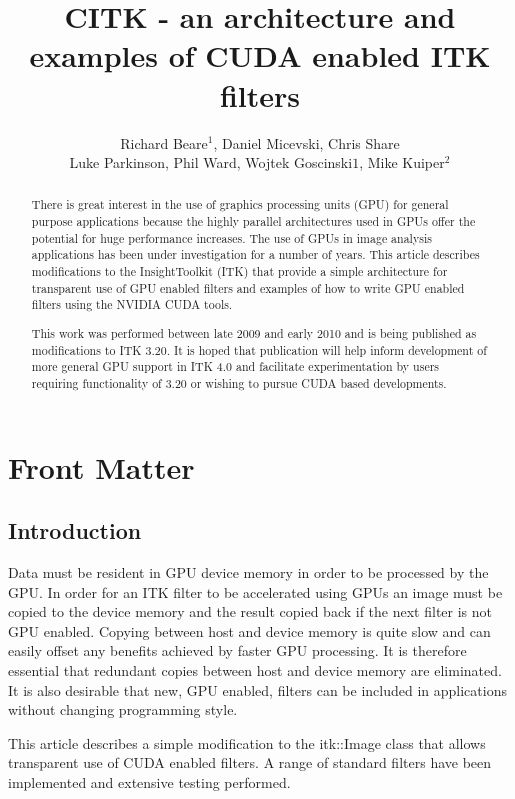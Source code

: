 \documentclass{InsightArticle}
\title{CITK - an architecture and examples of CUDA enabled ITK filters}
\author{Richard Beare{$^1$}, Daniel Micevski, Chris Share\\Luke
  Parkinson, Phil Ward, Wojtek Goscinski{$1$}, Mike Kuiper{$^2$}}
\begin{document}
\maketitle

\ifhtml
\chapter*{Front Matter\label{front}}
\fi


\begin{abstract}
\noindent
There is great interest in the use of graphics processing units (GPU)
for general purpose applications because the highly parallel
architectures used in GPUs offer the potential for huge performance
increases. The use of GPUs in image analysis applications has been
under investigation for a number of years. This article describes
modifications to the InsightToolkit (ITK) that provide a simple
architecture for transparent use of GPU enabled filters and examples
of how to write GPU enabled filters using the NVIDIA CUDA tools.

This work was performed between late 2009 and early 2010 and is being
published as modifications to ITK 3.20. It is hoped that publication will
help inform development of more general GPU support in ITK 4.0 and
facilitate experimentation by users requiring functionality of 3.20 or
wishing to pursue CUDA based developments.
\end{abstract}

\tableofcontents

\section{Introduction}
Data must be resident in GPU device memory in order to be processed by
the GPU. In order for an ITK filter to be accelerated using GPUs an
image must be copied to the device memory and the result copied back
if the next filter is not GPU enabled. Copying between host and device
memory is quite slow and can easily offset any benefits achieved by
faster GPU processing. It is therefore essential that redundant copies
between host and device memory are eliminated. It is also desirable
that new, GPU enabled, filters can be included in applications without
changing programming style.

This article describes a simple modification to the itk::Image class
that allows transparent use of CUDA enabled filters. A range of
standard filters have been implemented and extensive testing
performed.
\end{document}
